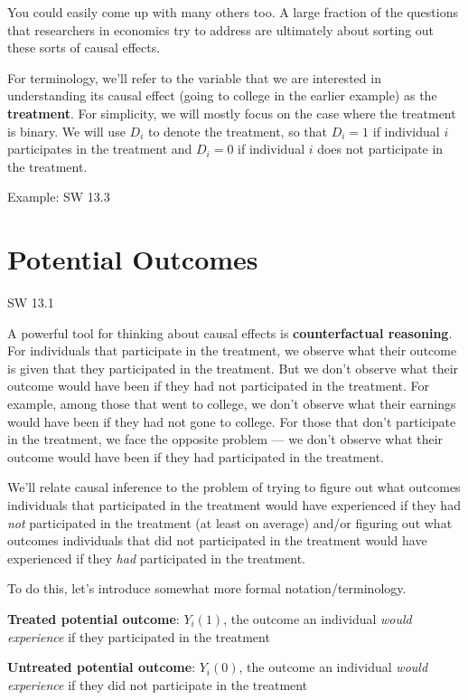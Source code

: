 \documentclass[
  letterpaper,
  DIV=11,
  numbers=noendperiod]{scrreprt}
\begin{document}
You could easily come up with many others too. A large fraction of the
questions that researchers in economics try to address are ultimately
about sorting out these sorts of causal effects.

For terminology, we'll refer to the variable that we are interested in
understanding its causal effect (going to college in the earlier
example) as the \textbf{treatment}. For simplicity, we will mostly focus
on the case where the treatment is binary. We will use \(D_i\) to denote
the treatment, so that \(D_i=1\) if individual \(i\) participates in the
treatment and \(D_i=0\) if individual \(i\) does not participate in the
treatment.

Example: SW 13.3

\section{Potential Outcomes}\label{potential-outcomes}

SW 13.1

A powerful tool for thinking about causal effects is
\textbf{counterfactual reasoning}. For individuals that participate in
the treatment, we observe what their outcome is given that they
participated in the treatment. But we don't observe what their outcome
would have been if they had not participated in the treatment. For
example, among those that went to college, we don't observe what their
earnings would have been if they had not gone to college. For those that
don't participate in the treatment, we face the opposite problem --- we
don't observe what their outcome would have been if they had
participated in the treatment.

We'll relate causal inference to the problem of trying to figure out
what outcomes individuals that participated in the treatment would have
experienced if they had \emph{not} participated in the treatment (at
least on average) and/or figuring out what outcomes individuals that did
not participated in the treatment would have experienced if they
\emph{had} participated in the treatment.

To do this, let's introduce somewhat more formal notation/terminology.

\textbf{Treated potential outcome}: \(Y_i(1)\), the outcome an
individual \emph{would experience} if they participated in the treatment

\textbf{Untreated potential outcome}: \(Y_i(0)\), the outcome an
individual \emph{would experience} if they did not participate in the
treatment
\end{document}
